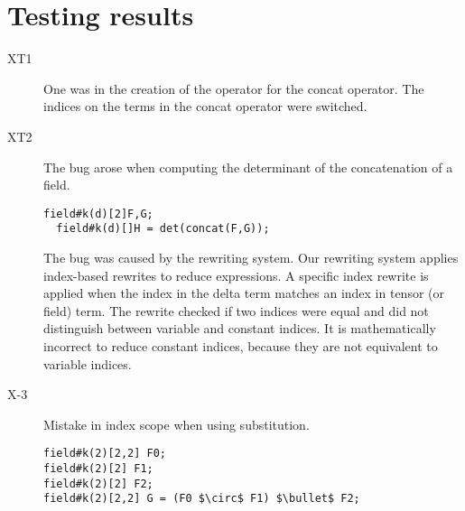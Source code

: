 \section{Testing results}
\begin{description}

\item[XT1]
One was in the creation of the \name{}  operator for the concat operator.
The indices on the terms in the concat \name{} operator were switched.
\item[XT2]
The bug arose when computing the determinant of the concatenation of a field.
\begin{lstlisting}[mathescape=true]
  field#k(d)[2]F,G;
  field#k(d)[]H = det(concat(F,G));
\end{lstlisting}
The bug was caused by the rewriting system.
Our rewriting system applies index-based rewrites to reduce \name{} expressions. 
A specific index rewrite is applied when the index in the delta term matches an index in tensor (or field)  term.
The rewrite checked if two indices were equal and did not distinguish between variable and constant indices.
It is mathematically incorrect to reduce constant indices, because they are not equivalent to variable indices.
\item[X-3] Mistake in index scope when using substitution.
\begin{lstlisting}
field#k(2)[2,2] F0;
field#k(2)[2] F1;
field#k(2)[2] F2;
field#k(2)[2,2] G = (F0 $\circ$ F1) $\bullet$ F2;
\end{lstlisting}


\end{description}
